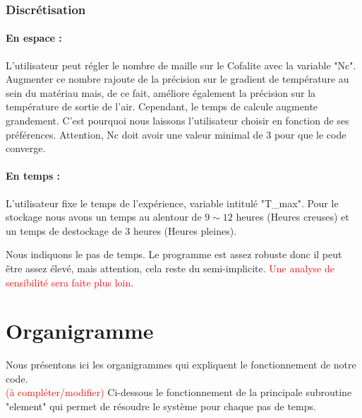 		\subsubsection{Discrétisation}
			\paragraph{En espace :}
			
		L'utilisateur peut régler le nombre de maille sur le Cofalite avec la variable "Nc". Augmenter ce nombre rajoute de la précision sur le gradient de température au sein du matériau mais, de ce fait, améliore également la précision sur la température de sortie de l'air. Cependant, le temps de calcule augmente grandement. C'est pourquoi nous laissons l'utilisateur choisir en fonction de ses préférences. Attention, Nc doit avoir une valeur minimal de 3 pour que le code converge.
			\paragraph{En temps :}
		L'utilisateur fixe le temps de l'expérience, variable intitulé "T\_max". Pour le stockage nous avons un temps au alentour de $9\sim12$ heures (Heures creuses) et un temps de destockage de 3 heures (Heures pleines). 
		
		Nous indiquons le pas de temps. Le programme est assez robuste donc il peut être assez élevé, mais attention, cela reste du semi-implicite. \textcolor{red}{Une analyse de sensibilité sera faite plus loin}.
		
		
			  
\section{Organigramme}
	Nous présentons ici les organigrammes qui expliquent le fonctionnement de notre code.\\
	
	\textcolor{red}{ (à compléter/modifier)}
	Ci-dessous le fonctionnement de la principale subroutine "element" qui permet de résoudre le système pour chaque pas de temps.
	
